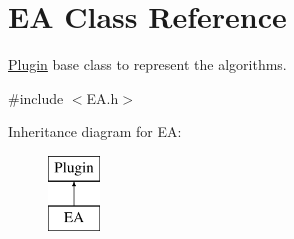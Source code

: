 \hypertarget{classEA}{}\section{EA Class Reference}
\label{classEA}


\mbox{\hyperlink{classPlugin}{Plugin}} base class to represent the algorithms.  




{\ttfamily \#include $<$E\+A.\+h$>$}

Inheritance diagram for EA\+:\begin{figure}[H]
\begin{center}
\leavevmode
\includegraphics[height=2.000000cm]{d0/dff/classEA}
\end{center}
\end{figure}
